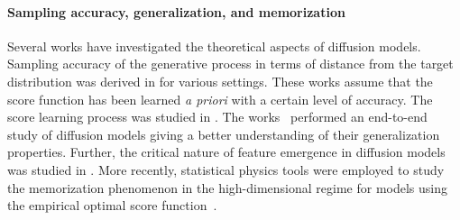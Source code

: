 \paragraph{Sampling accuracy, generalization, and memorization} Several works have investigated the theoretical aspects of diffusion models. Sampling accuracy of the generative process in terms of distance from the target distribution was derived in \cite{chen_sampling_2022,benton_nearly_2023,chen_improved_2023,bortoli_convergence_2022} for various settings. These works assume that the score function has been learned \emph{a priori} with a certain level of accuracy. The score learning process was studied in \cite{cui_analysis_2023,shah_learning_2023,han_neural_2023}. The works~\cite{kadkhodaie_generalization_2023,chen_score_2023,wang_evaluating_2024} performed an end-to-end study of diffusion models giving a better understanding of their generalization properties. Further, the critical nature of feature emergence in diffusion models was studied in \cite{li_critical_2024,sclocchi_phase_2025}.
More recently, statistical physics tools were employed to study the memorization phenomenon in the high-dimensional regime for models using the empirical optimal score function~\cite{biroli_dynamical_2024,raya_spontaneous_2023,ambrogioni_search_2024,achilli_losing_2024}. 


